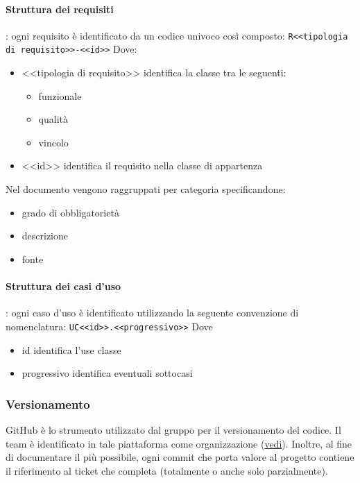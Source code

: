     \paragraph{Struttura dei requisiti}: ogni requisito è identificato da un codice univoco così composto:
    \newline
    \verb|R<<tipologia di requisito>>-<<id>>|
    \newline
    Dove:
    \begin{itemize}
        \item <<tipologia di requisito>> identifica la classe tra le seguenti:
        \begin{itemize}
            \item funzionale
            \item qualità
            \item vincolo
        \end{itemize}
        \item <<id>> identifica il requisito nella classe di appartenza
    \end{itemize}
    Nel documento vengono raggruppati per categoria specificandone:
    \begin{itemize}
        \item grado di obbligatorietà
        \item descrizione
        \item fonte
    \end{itemize}

    \paragraph{Struttura dei casi d'uso}: ogni caso d'uso è identificato utilizzando la seguente convenzione di nomenclatura:
    \newline
    \verb|UC<<id>>.<<progressivo>>|
    \newline
    Dove 
    \begin{itemize}
        \item id identifica l'use classe
        \item progressivo identifica eventuali sottocasi
    \end{itemize}

    \subsubsection{Versionamento}
    GitHub è lo strumento utilizzato dal gruppo per il versionamento del codice.
    \newline Il team è identificato in tale piattaforma come organizzazione (\href{https://github.com/catchEmAll-SWE}{vedi}).
    Inoltre, al fine di documentare il più possibile, ogni commit che porta valore al progetto contiene il riferimento al ticket che completa (totalmente o anche solo parzialmente). 
    
